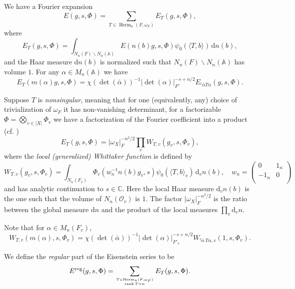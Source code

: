 \documentclass[reqno]{amsart}
\numberwithin{equation}{section}
\newcommand{\rd}{\mathrm{d}}
\newcommand{\BA}{\ensuremath{\mathbb{A}}\xspace}
\newcommand\mnote[1]{\marginpar{\tiny #1}}
\newcommand{\bs}{\backslash}
\DeclareMathOperator{\rank}{rank}
\DeclareMathOperator{\Herm}{Herm}
\newcommand{\Yundel}[1]{{\color{green} Delete: {#1}}}
\renewcommand{\j}[1]{\langle{#1}\rangle}
\newcommand{\ov}{\overline}
\renewcommand\a\alpha
\newcommand{\om}{\omega}
\newcommand\cE{\mathcal{E}}
\newcommand\cO{\mathcal{O}}
\theoremstyle{remark}
\numberwithin{equation}{section}
\begin{document}

We have a Fourier expansion 
$$E(g,s,\Phi)=\sum_{T\in\Herm_n(F,\om_{F})}E_T(g,s,\Phi),$$ 
where
 $$E_T(g,s,\Phi)=\int_{N_n(F)\backslash N_n(\mathbb{A})} E(n(b)g,s,\Phi)\psi_{0}(\j{T,b})\,\rd n(b),$$ 
and the Haar measure $\rd n(b)$ is normalized such that $N_{n}(F)\bs N_{n}(\BA)$ has volume $1$. 
For any $\a\in M_{n}(\BA)$ we have
\begin{equation}\label{Eis ch base}
E_{T}(m(\a)g,s,\Phi)=\chi(\det(\bar\alpha))^{-1}|\det(\alpha)|^{-s+n/2}_{F'}E_{{}^{t}\ov\a T \a}(g,s,\Phi).
\end{equation}


Suppose $T$ is \emph{nonsingular}, meaning that for one (equivalently, any) choice of trivialization of $\omega_F$ it has non-vanishing determinant, for a factorizable $\Phi=\bigotimes_{v\in|X|}\Phi_v$ we have a factorization of the Fourier coefficient into a product (cf. \cite[\S 4]{Kudla1997})
\begin{equation}\label{Eis factor Wh}
E_T(g,s,\Phi)=|\om_{X}|_{F}^{-n^{2}/2}\prod_v W_{T,v}(g_v, s, \Phi_v),
\end{equation}
where the \emph{local (generalized) Whittaker function} is defined by 
$$W_{T,v}(g_v, s, \Phi_v)=\int_{N_n(F_{v})}\Phi_v(w_n^{-1}n(b)g_v,s) \psi_{0}(\j{T,b}_{v})
\, \rd_{v} n(b),\quad w_n=
\begin{pmatrix}
0  & 1_n\\
  -1_n & 0\\
\end{pmatrix}$$ 
and has analytic continuation to $s\in \mathbb{C}$. Here the local Haar measure $\rd_{v} n(b)$ is the one such that the volume of $N_{n}(\cO_{v})$ is $1$. The factor $|\om_{X}|_{F}^{-n^{2}/2}$ is the ratio between the global measure $\rd n$ and the product of the local measures $\prod_{v}\rd_{v}n$.

Note that for $\a\in M_{n}(F_{v})$,
\begin{equation}\label{eq:ch base}
W_{T,v}(m(\alpha), s, \Phi_v)=\chi(\det(\bar\alpha))^{-1}|\det(\alpha)|^{-s+n/2}_{F'_v}W_{^t\bar\alpha\,T\alpha,v}(1, s, \Phi_v).
\end{equation}

We define the {\em regular} part of the Eisenstein series to be
\begin{equation}\label{eq:def reg}
E^{\rm reg}(g,s,\Phi)=\sum_{T\in\Herm_n(F,\om_{F})\atop \rank T=n}E_T(g,s,\Phi).
\end{equation}
\end{document}
